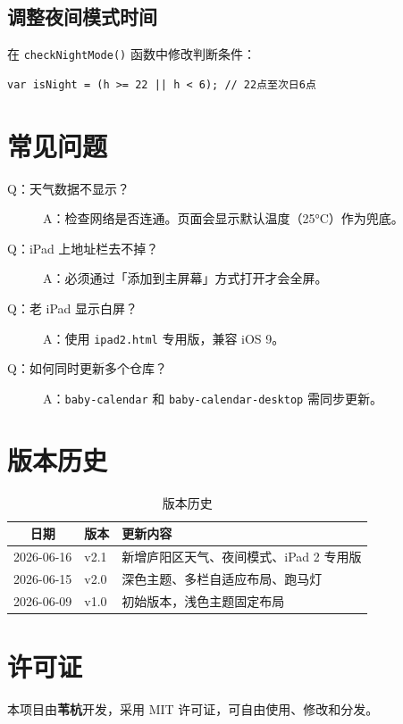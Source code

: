 \documentclass[12pt,a4paper,fontset=fandol]{ctexart}
\begin{document}
\subsection{调整夜间模式时间}

在 \texttt{checkNightMode()} 函数中修改判断条件：

\begin{lstlisting}[basicstyle=\ttfamily\small]
var isNight = (h >= 22 || h < 6); // 22点至次日6点
\end{lstlisting}

\section{常见问题}

\begin{description}
    \item[Q：天气数据不显示？] A：检查网络是否连通。页面会显示默认温度（25°C）作为兜底。
    \item[Q：iPad 上地址栏去不掉？] A：必须通过「添加到主屏幕」方式打开才会全屏。
    \item[Q：老 iPad 显示白屏？] A：使用 \texttt{ipad2.html} 专用版，兼容 iOS 9。
    \item[Q：如何同时更新多个仓库？] A：\texttt{baby-calendar} 和 \texttt{baby-calendar-desktop} 需同步更新。
\end{description}

\section{版本历史}

\begin{table}[htbp]
\centering
\begin{tabular}{cll}
\toprule
\textbf{日期} & \textbf{版本} & \textbf{更新内容} \\
\midrule
2026-06-16 & v2.1 & 新增庐阳区天气、夜间模式、iPad 2 专用版 \\
2026-06-15 & v2.0 & 深色主题、多栏自适应布局、跑马灯 \\
2026-06-09 & v1.0 & 初始版本，浅色主题固定布局 \\
\bottomrule
\end{tabular}
\caption{版本历史}
\end{table}

\section{许可证}

本项目由\textbf{苇杭}开发，采用 MIT 许可证，可自由使用、修改和分发。
\end{document}
